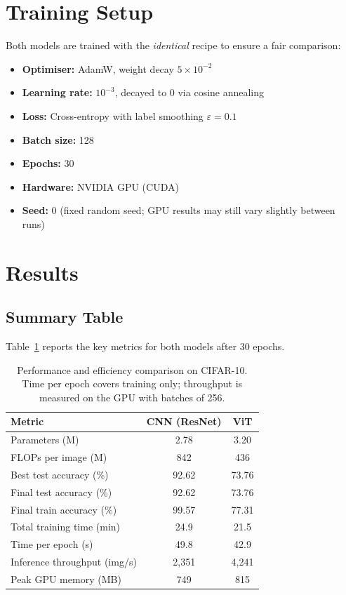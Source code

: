 \documentclass[11pt,a4paper]{article}
\begin{document}
\section{Training Setup}

Both models are trained with the \emph{identical} recipe to ensure a fair comparison:

\begin{itemize}
  \item \textbf{Optimiser:} AdamW, weight decay $5\times10^{-2}$
  \item \textbf{Learning rate:} $10^{-3}$, decayed to 0 via cosine annealing
  \item \textbf{Loss:} Cross-entropy with label smoothing $\varepsilon = 0.1$
  \item \textbf{Batch size:} 128
  \item \textbf{Epochs:} 30
  \item \textbf{Hardware:} NVIDIA GPU (CUDA)
  \item \textbf{Seed:} 0 (fixed random seed; GPU results may still vary slightly between runs)
\end{itemize}

\section{Results}

\subsection{Summary Table}

Table~\ref{tab:summary} reports the key metrics for both models after 30 epochs.

\begin{table}[H]
\centering
\caption{Performance and efficiency comparison on CIFAR-10. Time per epoch covers training only;
throughput is measured on the GPU with batches of 256.}
\label{tab:summary}
\begin{tabular}{lcc}
\toprule
\textbf{Metric} & \textbf{CNN (ResNet)} & \textbf{ViT} \\
\midrule
Parameters (M)              & 2.78  & 3.20  \\
FLOPs per image (M)         & 842   & 436   \\
Best test accuracy (\%)     & 92.62 & 73.76 \\
Final test accuracy (\%)    & 92.62 & 73.76 \\
Final train accuracy (\%)   & 99.57 & 77.31 \\
Total training time (min)   & 24.9  & 21.5  \\
Time per epoch (s)          & 49.8  & 42.9  \\
Inference throughput (img/s)& 2{,}351 & 4{,}241 \\
Peak GPU memory (MB)        & 749     & 815     \\
\bottomrule
\end{tabular}
\end{table}
\end{document}

